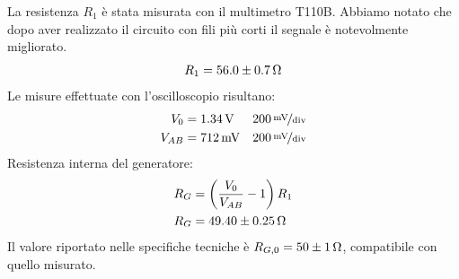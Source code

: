 \documentclass[italian,a4paper]{article}
\begin{document}
La resistenza $R_1$ è stata misurata con il multimetro T110B.
Abbiamo notato che dopo aver realizzato il circuito con fili più corti il segnale è
notevolmente migliorato.
\begin{equation*}
  R_1=\unit[56.0 \pm 0.7]{\ohm}
\end{equation*}
Le misure effettuate con l'oscilloscopio risultano:
\begin{align*}
V_{0}&=\unit[1.34]{V} &\unitfrac[200]{mV}{div}\\
V_{AB}&=\unit[712]{mV}& \unitfrac[200]{mV}{div}\\
\end{align*}
Resistenza interna del generatore:
\begin{align*}
R_G&=\left(\dfrac{V_0}{V_{AB}}-1 \right)R_1 \\
R_G&= \unit[49.40 \pm 0.25]{\ohm} \\
\end{align*}
Il valore riportato nelle specifiche tecniche è $R_{G,0} = \unit[50 \pm
1]{\ohm}$, compatibile con quello misurato.
\end{document}
